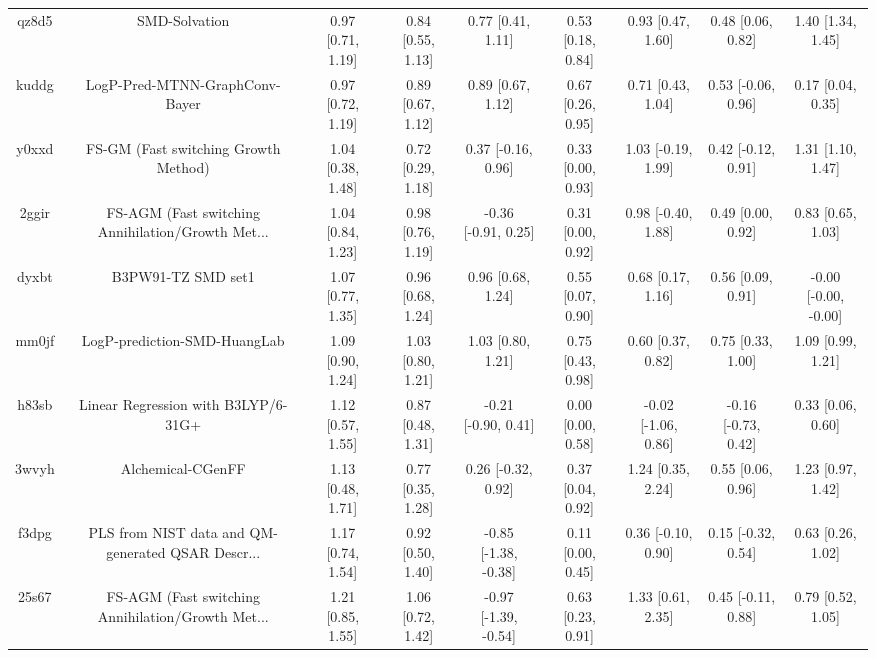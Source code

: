\documentclass{article}
\begin{document}
\begin{center}
\begin{longtable}{|ccccccccc|}
 qz8d5 &                                      SMD-Solvation &  0.97 [0.71, 1.19] &  0.84 [0.55, 1.13] &     0.77 [0.41, 1.11] &  0.53 [0.18, 0.84] &    0.93 [0.47, 1.60] &    0.48 [0.06, 0.82] &     1.40 [1.34, 1.45] \\
 kuddg &                     LogP-Pred-MTNN-GraphConv-Bayer &  0.97 [0.72, 1.19] &  0.89 [0.67, 1.12] &     0.89 [0.67, 1.12] &  0.67 [0.26, 0.95] &    0.71 [0.43, 1.04] &   0.53 [-0.06, 0.96] &     0.17 [0.04, 0.35] \\
 y0xxd &               FS-GM (Fast switching Growth Method) &  1.04 [0.38, 1.48] &  0.72 [0.29, 1.18] &    0.37 [-0.16, 0.96] &  0.33 [0.00, 0.93] &   1.03 [-0.19, 1.99] &   0.42 [-0.12, 0.91] &     1.31 [1.10, 1.47] \\
 2ggir &  FS-AGM (Fast switching Annihilation/Growth Met... &  1.04 [0.84, 1.23] &  0.98 [0.76, 1.19] &   -0.36 [-0.91, 0.25] &  0.31 [0.00, 0.92] &   0.98 [-0.40, 1.88] &    0.49 [0.00, 0.92] &     0.83 [0.65, 1.03] \\
 dyxbt &                                 B3PW91-TZ SMD set1 &  1.07 [0.77, 1.35] &  0.96 [0.68, 1.24] &     0.96 [0.68, 1.24] &  0.55 [0.07, 0.90] &    0.68 [0.17, 1.16] &    0.56 [0.09, 0.91] &  -0.00 [-0.00, -0.00] \\
 mm0jf &                       LogP-prediction-SMD-HuangLab &  1.09 [0.90, 1.24] &  1.03 [0.80, 1.21] &     1.03 [0.80, 1.21] &  0.75 [0.43, 0.98] &    0.60 [0.37, 0.82] &    0.75 [0.33, 1.00] &     1.09 [0.99, 1.21] \\
 h83sb &                Linear Regression with B3LYP/6-31G+ &  1.12 [0.57, 1.55] &  0.87 [0.48, 1.31] &   -0.21 [-0.90, 0.41] &  0.00 [0.00, 0.58] &  -0.02 [-1.06, 0.86] &  -0.16 [-0.73, 0.42] &     0.33 [0.06, 0.60] \\
 3wvyh &                                  Alchemical-CGenFF &  1.13 [0.48, 1.71] &  0.77 [0.35, 1.28] &    0.26 [-0.32, 0.92] &  0.37 [0.04, 0.92] &    1.24 [0.35, 2.24] &    0.55 [0.06, 0.96] &     1.23 [0.97, 1.42] \\
 f3dpg &  PLS from NIST data and QM-generated QSAR Descr... &  1.17 [0.74, 1.54] &  0.92 [0.50, 1.40] &  -0.85 [-1.38, -0.38] &  0.11 [0.00, 0.45] &   0.36 [-0.10, 0.90] &   0.15 [-0.32, 0.54] &     0.63 [0.26, 1.02] \\
 25s67 &  FS-AGM (Fast switching Annihilation/Growth Met... &  1.21 [0.85, 1.55] &  1.06 [0.72, 1.42] &  -0.97 [-1.39, -0.54] &  0.63 [0.23, 0.91] &    1.33 [0.61, 2.35] &   0.45 [-0.11, 0.88] &     0.79 [0.52, 1.05] \\

\end{longtable}
\end{center}
\end{document}
